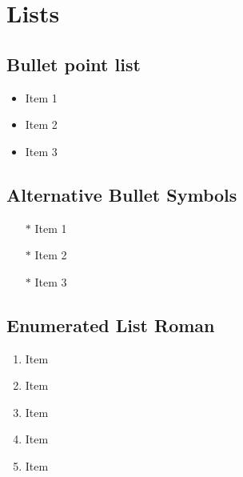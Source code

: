 \section{Lists}
\subsection{Bullet point list}
    \begin{itemize}
        \item Item 1
        \item Item 2
        \item Item 3
    \end{itemize}

\subsection{Alternative Bullet Symbols}
    \begin{itemize}
        \item[$\ast$] Item 1
        \item[$\ast$] Item 2
        \item[$\ast$] Item 3  
    \end{itemize}

\subsection{Enumerated List Roman}
    \begin{enumerate}[label=(\Roman*)]
        \item Item
        \item Item
        \item Item
        \item Item
        \item Item
    \end{enumerate}